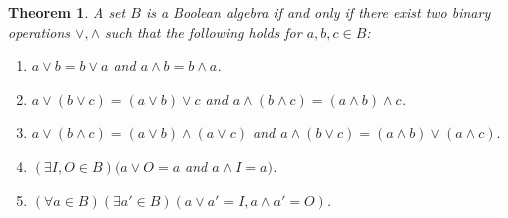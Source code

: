 \documentclass[10pt, letterpaper]{article}
\newtheorem{theorem}{Theorem}
\theoremstyle{definition}
\begin{document}
\begin{theorem}\label{thm_ba_iff_set}
	A set \(B\) is a Boolean algebra if and only if there exist two binary operations
	\(\vee, \wedge\) such that the following holds for \(a,b,c\in B\):
	\begin{enumerate}
		\item \(a\vee b=b\vee a\) and \(a\wedge b = b\wedge a\).
		\item \(a\vee(b\vee c)=(a\vee b)\vee c\) and 
			\(a\wedge(b\wedge c)=(a\wedge b)\wedge c\).
		\item 
			\(a\vee(b\wedge c)=(a\vee b)\wedge (a\vee c)\) and
			\(a\wedge(b\vee c)=(a\wedge b)\vee (a\wedge c).\)
		\item \((\exists I,O\in B)(a\vee O = a\) and \(a\wedge I=a)\).
		\item \((\forall a\in B)(\exists a'\in B)(a\vee a'=I, a\wedge a'=O)\).
	\end{enumerate}
\end{theorem}
\end{document}
